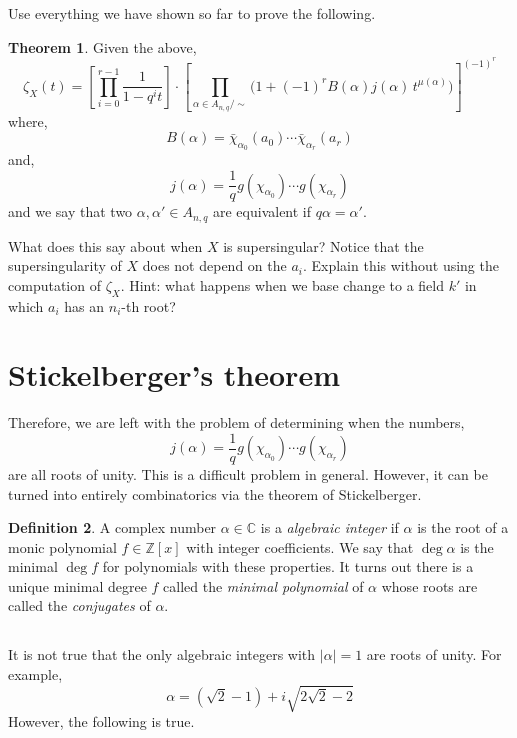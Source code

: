\documentclass[12pt]{article}
\newcommand{\ZZ}{\mathbb{Z}}
\newcommand{\CC}{\mathbb{C}}
\theoremstyle{remark}
\theoremstyle{definition}
\newtheorem{theorem}{Theorem}[subsection]
\newtheorem{defn}[theorem]{Definition}
\begin{document}
Use everything we have shown so far to prove the following.

\begin{theorem} \label{thm:diagonal_zeta_function}
Given the above,
\[ \zeta_X(t) = \left[ \prod_{i = 0}^{r-1} \frac{1}{1-q^i t} \right] \cdot  \left[ \prod_{\alpha \in A_{n,q} / \sim} \bigg( 1 + (-1)^r B(\alpha) j(\alpha) \, t^{\mu(\alpha)} \bigg) \right]^{(-1)^r} \]
where,
\[ B(\alpha) = \bar{\chi}_{\alpha_0}(a_0) \cdots \bar{\chi}_{\alpha_r}(a_r) \]
and,
\[ j(\alpha) = \frac{1}{q} g(\chi_{\alpha_0}) \cdots g(\chi_{\alpha_r}) \]
and we say that two $\alpha, \alpha' \in A_{n,q}$ are equivalent if $q \alpha = \alpha'$.
\end{theorem}

What does this say about when $X$ is supersingular? Notice that the supersingularity of $X$ does not depend on the $a_i$. Explain this without using the computation of $\zeta_X$. Hint: what happens when we base change to a field $k'$ in which $a_i$ has an $n_i$-th root?

\section{Stickelberger's theorem}

Therefore, we are left with the problem of determining when the numbers,
\[ j(\alpha) = \frac{1}{q} g(\chi_{\alpha_0}) \cdots g(\chi_{\alpha_r}) \]
are all roots of unity. This is a difficult problem in general. However, it can be turned into entirely combinatorics via the theorem of Stickelberger.


\begin{defn}
A complex number $\alpha \in \CC$ is a \textit{algebraic integer} if $\alpha$ is the root of a monic polynomial $f \in \ZZ[x]$ with integer coefficients. We say that $\deg{\alpha}$ is the minimal $\deg{f}$ for polynomials with these properties. It turns out there is a unique minimal degree $f$ called the \textit{minimal polynomial} of $\alpha$ whose roots are called the \textit{conjugates} of $\alpha$.
\end{defn}

\subsection{}

It is not true that the only algebraic integers with $|\alpha| = 1$ are roots of unity. For example,
\[ \alpha = (\sqrt{2} - 1) + i \sqrt{2 \sqrt{2} - 2} \]
However, the following is true.
\end{document}
